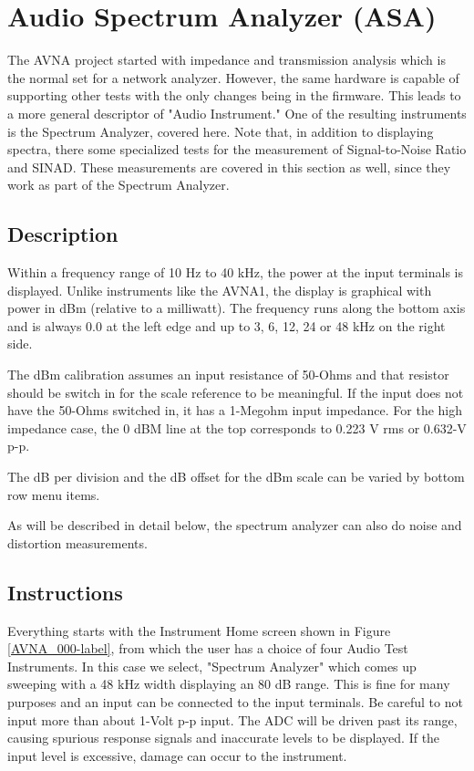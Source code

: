 \section{Audio Spectrum Analyzer (ASA)}
\label{sect:ASA}
The AVNA project started with impedance and transmission analysis which is the normal set for a network analyzer.  However, the same hardware is capable of supporting other tests with the only changes being in the firmware.  This leads to a more general descriptor of "Audio Instrument."  One of the resulting instruments is the Spectrum Analyzer, covered here.  Note that, in addition to displaying spectra,  there some specialized tests for the measurement of Signal-to-Noise Ratio and SINAD.  These measurements are covered in this section as well, since they work as part of the Spectrum Analyzer.
\subsection{Description}
\label{subsect:ASADescr}
Within a frequency range of 10 Hz to 40 kHz, the power at the  input terminals is displayed.  Unlike instruments like the AVNA1, the display is graphical with power in dBm (relative to a milliwatt).  The frequency runs along the bottom axis and is always 0.0 at the left edge and up to 3, 6, 12, 24 or 48 kHz on the right side. 

The dBm calibration assumes an input resistance of 50-Ohms and that resistor should be switch in for the scale reference to be meaningful.  If the input does not have the 50-Ohms switched in, it has a 1-Megohm input impedance.  For the high impedance case, the 0 dBM line at the top corresponds to 0.223 V rms or 0.632-V p-p.

The dB per division and the dB offset for the dBm scale can be varied by bottom row menu items.

As will be described in detail below, the spectrum analyzer can also do noise and  distortion measurements.

\subsection{Instructions}
\label{subsect:ASAInstr}
Everything starts with the Instrument Home screen shown in  Figure \ref{AVNA_000-label},  from which the user has a choice of four Audio Test Instruments. In this case we select, "\textsf{Spectrum Analyzer}"  which comes up sweeping with a 48 kHz width displaying an 80 dB range.   This is fine for many purposes and an input can be connected to the  input terminals.  Be careful to not input more than about 1-Volt p-p input.  The ADC will be driven past its range, causing spurious response signals and inaccurate levels to be displayed.  If the input level is excessive,  damage can occur to the instrument.

